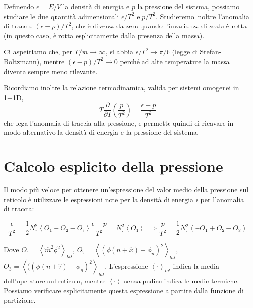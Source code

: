 \documentclass[a4paper,11pt]{article}
\newcommand{\avg}[1]{\left\langle {#1} \right\rangle}
\begin{document}
    Definendo $\epsilon = E/V$ la densità di energia e $p$ la pressione del sistema, possiamo studiare le due quantità adimensionali $\epsilon / T^2$ e $p / T^2$. Studieremo inoltre l'anomalia di traccia $(\epsilon - p)/T^2$, che è diversa da zero quando l'invarianza di scala è rotta (in questo caso, è rotta esplicitamente dalla presenza della massa).
    
    Ci aspettiamo che, per $T/m \to \infty$, si abbia $\epsilon / T^2 \to \pi/6$ (legge di Stefan-Boltzmann), mentre $(\epsilon - p) / T^2 \to 0$ perché ad alte temperature la massa diventa sempre meno rilevante.
    
    Ricordiamo inoltre la relazione termodinamica, valida per sistemi omogenei in 1+1D,
    \begin{equation}
        T\frac{\partial}{\partial T} \left(\frac{p}{T^2}\right) = \frac{\epsilon - p}{T^2}
        \label{eqn:pressure_from_anomaly}
    \end{equation}
    che lega l'anomalia di traccia alla pressione, e permette quindi di ricavare in modo alternativo la densità di energia e la pressione del sistema.
    

    \section{Calcolo esplicito della pressione}
    
    Il modo più veloce per ottenere un'espressione del valor medio della pressione sul reticolo è utilizzare le espressioni note per la densità di energia e per l'anomalia di traccia:
    
    \begin{subequations}
        \begin{equation}
            \frac{\epsilon}{T^2} = \frac{1}{2}N_\tau^2 \avg{O_1 + O_2 - O_3} 
        \end{equation}
        \begin{equation}
            \frac{\epsilon - p}{T^2} = N_\tau^2 \avg{O_1}
        \end{equation}
        \begin{equation}
         \implies \frac{p}{T^2} = \frac{1}{2} N_\tau^2 \avg{-O_1 + O_2 - O_3}
         \label{eqn:pressure}
        \end{equation}
    \end{subequations}

    Dove $O_1 = \avg{\hat{m}^2 \phi^2}_{lat}$, $O_2 = \avg{(\phi(n + \hat{x}) - \phi_n)^2}_{lat}$, $O_3 = \avg{((\phi(n + \hat{\tau}) - \phi_n)^2}_{lat}$. L'espressione $\avg{\cdot}_{lat}$ indica la media dell'operatore sul reticolo, mentre $\avg{\cdot}$ senza pedice indica le medie termiche. Possiamo verificare esplicitamente questa espressione a partire dalla funzione di partizione.
    
\end{document}

